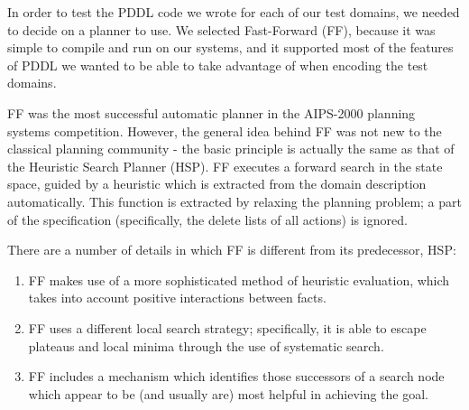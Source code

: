 In order to test the PDDL code we wrote for each of our test domains, we needed to decide on a planner to use. We selected Fast-Forward (FF), because it was simple to compile and run on our systems, and it supported most of the features of PDDL we wanted to be able to take advantage of when encoding the test domains. 

FF was the most successful automatic planner in the AIPS-2000 planning systems competition. However, the general idea behind FF was not new to the classical planning community - the basic principle is actually the same as that of the Heuristic Search Planner (HSP). FF executes a forward search in the state space, guided by a heuristic which is extracted from the domain description automatically. This function is extracted by relaxing the planning problem; a part of the specification (specifically, the delete lists of all actions) is ignored. 

There are a number of details in which FF is different from its predecessor, HSP:
\begin{enumerate}
    \item FF makes use of a more sophisticated method of heuristic evaluation, which takes into account positive interactions between facts.
    \item FF uses a different local search strategy; specifically, it is able to escape plateaus and local minima through the use of systematic search.
    \item FF includes a mechanism which identifies those successors of a search node which appear to be (and usually are) most helpful in achieving the goal. 
\end{enumerate}